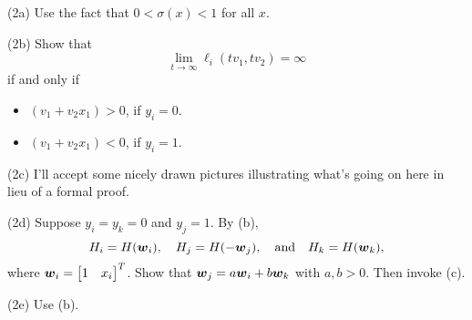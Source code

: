 \documentclass[12pt]{amsart}
\begin{document}
        (2a) Use the fact that $0<\sigma(x)<1$ for all $x$.

        (2b) Show that
        \[
            \lim_{t\to\infty}\ell_i(tv_1, tv_2)=\infty
        \]
        if and only if
        \begin{itemize}
            \item $(v_1+v_2x_1)>0$, if $y_i=0$.
            \item $(v_1+v_2x_1)<0$, if $y_i=1$.
        \end{itemize}

        (2c) I'll accept some nicely drawn pictures illustrating what's going on here in lieu of a formal proof. 

        (2d) Suppose $y_i=y_k=0$ and $y_j=1$. By (b),
        \[
            H_i=H(\boldsymbol{w}_i),\quad H_j=H(-\boldsymbol{w}_j),\quad\text{and}\quad
            H_k=H(\boldsymbol{w}_k),
        \]
        where $\boldsymbol{w}_i=\begin{bmatrix}
            1&x_i
        \end{bmatrix}^T$.
        Show that $\boldsymbol{w}_j = a\boldsymbol{w}_i + b\boldsymbol{w}_k$ with $a, b>0$. Then invoke (c).

        (2e) Use (b).
    
\end{document}

